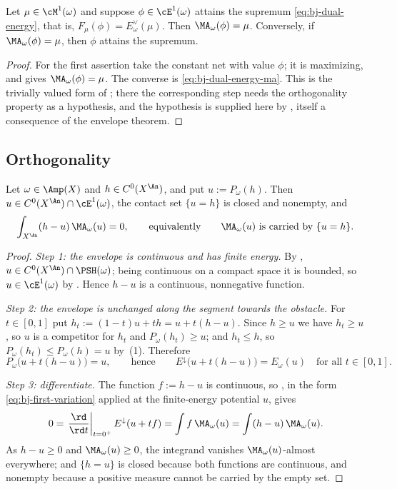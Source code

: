 \begin{corollary}
\label{cor:ch47-maximizer-solves}
Let $\mu\in\cM^1(\omega)$ and suppose $\phi\in\cE^1(\omega)$ attains
the supremum \eqref{eq:bj-dual-energy}, that is,
$F_\mu(\phi)=E^\vee_\omega(\mu)$.  Then $\MA_\omega(\phi)=\mu$.
Conversely, if $\MA_\omega(\phi)=\mu$, then $\phi$ attains the
supremum.
\end{corollary}

\begin{proof}
For the first assertion take the constant net with value $\phi$; it is
maximizing, and  gives
$\MA_\omega(\phi)=\mu$.  The converse is
\eqref{eq:bj-dual-energy-ma}.  This is the trivially valued form of
; there the corresponding step
needs the orthogonality property as a hypothesis, and the hypothesis is
supplied here by , itself a
consequence of the envelope theorem.
\end{proof}

\subsection{Orthogonality}
\label{sec:ch47-orthogonality-proper}

\begin{theorem}
\label{thm:ch47-orthogonality-continuous}
Let $\omega\in\Amp(X)$ and $h\in C^0(X^{\An})$, and put
$u:=P_\omega(h)$.  Then $u\in C^0(X^{\An})\cap\cE^1(\omega)$, the
contact set $\{u=h\}$ is closed and nonempty, and
\[
 \int_{X^{\An}}(h-u)\,\MA_\omega(u)=0 ,
 \qquad\text{equivalently}\qquad
 \MA_\omega(u)\ \text{is carried by}\ \{u=h\} .
\]
\end{theorem}

\begin{proof}
\emph{Step 1: the envelope is continuous and has finite energy.}  By
, $u\in C^0(X^{\An})\cap\PSH(\omega)$;
being continuous on a compact space it is bounded, so
$u\in\cE^1(\omega)$ by .  Hence $h-u$ is a
continuous, nonnegative function.

\emph{Step 2: the envelope is unchanged along the segment towards the
obstacle.}  For $t\in[0,1]$ put $h_t:=(1-t)u+th=u+t(h-u)$.  Since
$h\ge u$ we have $h_t\ge u$, so $u$ is a competitor for $h_t$ and
$P_\omega(h_t)\ge u$; and $h_t\le h$, so
$P_\omega(h_t)\le P_\omega(h)=u$ by
\,(1).  Therefore
\[
 P_\omega\bigl(u+t(h-u)\bigr)=u,
 \qquad\text{hence}\qquad
 E^\downarrow\bigl(u+t(h-u)\bigr)=E_\omega(u)
 \quad\text{for all }t\in[0,1].
\]

\emph{Step 3: differentiate.}  The function $f:=h-u$ is continuous, so
, in the form
\eqref{eq:bj-first-variation} applied at the finite-energy potential
$u$, gives
\[
 0=\left.\frac{\rd}{\rd t}\right|_{t=0^+}E^\downarrow(u+tf)
 =\int f\,\MA_\omega(u)
 =\int(h-u)\,\MA_\omega(u).
\]
As $h-u\ge0$ and $\MA_\omega(u)\ge0$, the integrand vanishes
$\MA_\omega(u)$-almost everywhere; and $\{h=u\}$ is closed because both
functions are continuous, and nonempty because a positive measure cannot be
carried by the empty set.
\end{proof}

